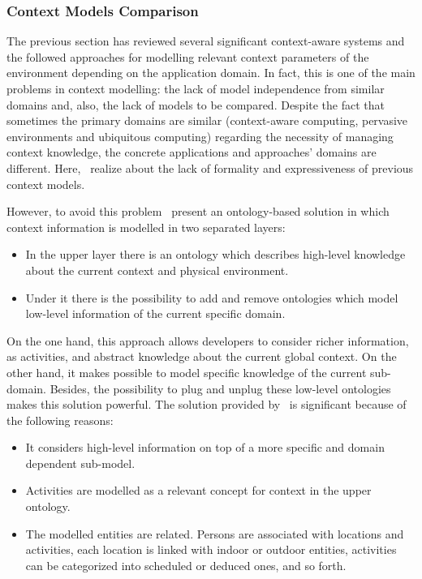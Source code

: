 
\subsubsection{Context Models Comparison}
\label{sec:context_model_comparison}

The previous section has reviewed several significant context-aware systems and 
the followed approaches for modelling relevant context parameters of the environment
depending on the application domain. In fact, this is one of the main problems in
context modelling: the lack of model independence from similar domains and, also,
the lack of models to be compared. Despite the fact that sometimes the primary
domains are similar (context-aware computing, pervasive environments and ubiquitous
computing) regarding the necessity of managing context knowledge, the concrete
applications and approaches' domains are different. 
Here,~\citet{henricksen_modeling_2002} realize about the lack of formality and 
expressiveness of previous context models.

However, to avoid this problem~\citet{gu_ontology_based_2004} present an
ontology-based solution in which context information is modelled in two separated
layers:

\begin{itemize}
  \item In the upper layer there is an ontology which describes high-level 
  knowledge about the current context and physical environment.
  \item Under it there is the possibility to add and remove ontologies which
  model low-level information of the current specific domain.
\end{itemize}

On the one hand, this approach allows developers to consider richer information,
as activities, and abstract knowledge about the current global context. On the
other hand, it makes possible to model specific knowledge of the current sub-domain.
Besides, the possibility to plug and unplug these low-level ontologies makes this
solution powerful. The solution provided by~\citet{gu_toward_2004} is significant
because of the following reasons:

\begin{itemize}
  \item It considers high-level information on top of a more specific and domain
  dependent sub-model. 
  \item Activities are modelled as a relevant concept for context in the upper
  ontology.
  \item The modelled entities are related. Persons are associated with locations
  and activities, each location is linked with indoor or outdoor entities, 
  activities can be categorized into scheduled or deduced ones, and so forth. 
\end{itemize}

